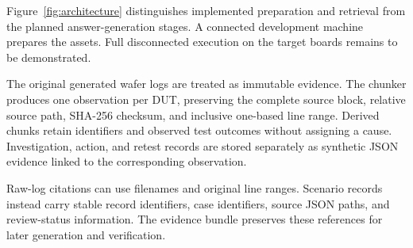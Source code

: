 \documentclass[conference]{IEEEtran}
\begin{document}
Figure~\ref{fig:architecture} distinguishes implemented preparation
and retrieval from the planned answer-generation stages.
A connected development machine prepares the assets.
Full disconnected execution on the target boards remains
to be demonstrated.

The original generated wafer logs are treated as immutable evidence.
The chunker produces one observation per DUT, preserving the complete
source block, relative source path, SHA-256 checksum, and inclusive
one-based line range. Derived chunks retain identifiers and observed
test outcomes without assigning a cause. Investigation, action,
and retest records are stored separately as synthetic JSON evidence
linked to the corresponding observation.

Raw-log citations can use filenames and original line ranges.
Scenario records instead carry stable record identifiers,
case identifiers, source JSON paths, and review-status information.
The evidence bundle preserves these references for later generation
and verification.
\end{document}
